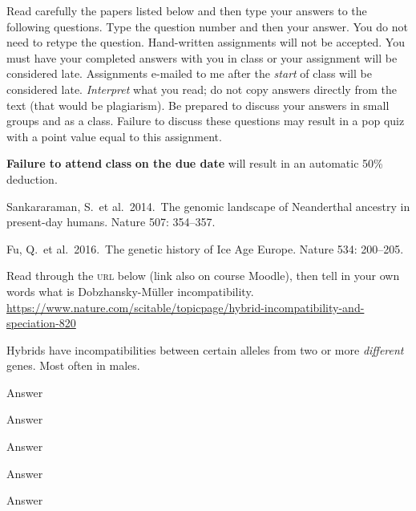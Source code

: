 \documentclass[11pt, hidelinks, addpoints]{exam}
\begin{document}
Read carefully the papers listed below and then type your answers to the following questions.
Type the question number and then your answer. You do not need to retype the question. Hand-written
assignments will not be accepted. You must have your completed answers
with you in class or your assignment will be considered late. Assignments e-mailed to me after the \emph{start} of class will be
considered late. \emph{Interpret} what you read; do not copy answers directly from the text (that would
be plagiarism). Be prepared to discuss your answers in small groups and as a class. Failure
to discuss these questions may result in a pop quiz with a point value
equal to this assignment.

\textbf{Failure to attend} \textbf{class} \textbf{on the due date} will
result in an automatic 50\% deduction.

\begin{hangparas}{1.5em}{1}
Sankararaman, S.~et al.~2014.~The genomic landscape of Neanderthal ancestry in present-day humans. Nature 507: 354–357.

Fu, Q.~et al.~2016.~The genetic history of Ice Age Europe. Nature 534: 200–205. 
\end{hangparas}


\begin{questions}
\question[5]
Read through the \textsc{url} below (link also on course Moodle), then tell in your own words what is Dobzhansky-Müller incompatibility. \url{https://www.nature.com/scitable/topicpage/hybrid-incompatibility-and-speciation-820}

\begin{solution}
	Hybrids have incompatibilities between certain alleles from two or more \emph{different} genes. Most often in males.
\end{solution}

\question[5]

\begin{solution}
Answer
\end{solution}

\question[5]

\begin{solution}
Answer
\end{solution}


\question[5]

\begin{solution}
Answer
\end{solution}


\question[5]

\begin{solution}
Answer
\end{solution}


\question[5]

\begin{solution}
Answer
\end{solution}


\end{questions}
\end{document}
